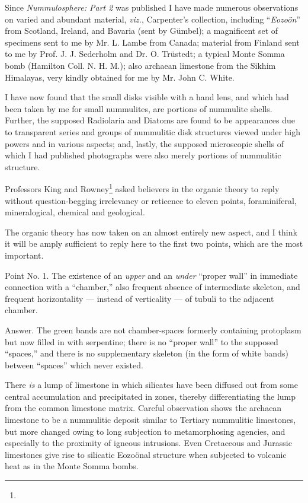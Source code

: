 \documentclass[a4paper, 12pt, oneside]{article}
\begin{document}
Since \emph{Nummulosphere: Part 2} was published I have made numerous observations on varied and abundant material, \emph{viz.}, Carpenter's collection, including ``\emph{Eozoön}'' from Scotland, Ireland, and Bavaria (sent by Gümbel); a magnificent set of specimens sent to me by Mr. L. Lambe from Canada; material from Finland sent to me by Prof. J. J. Sederholm and Dr. O. Trüstedt; a typical Monte Somma bomb (Hamilton Coll. N. H. M.); also archaean limestone from the Sikhim Himalayas, very kindly obtained for me by Mr. John C. White.

I have now found that the small disks visible with a hand lens, and which had been taken by me for small nummulites, are portions of nummulite shells. Further, the supposed Radiolaria and Diatoms are found to be appearances due to transparent series and groups of nummulitic disk structures viewed under high powers and in various aspects; and, lastly, the supposed microscopic shells of which I had published photographs were also merely portions of nummulitic structure.

Professors King and Rowney\footnote{} asked believers in the organic theory to reply without question-begging irrelevancy or reticence to eleven points, foraminiferal, mineralogical, chemical and geological.

The organic theory has now taken on an almost entirely new aspect, and I think it will be amply sufficient to reply here to the first two points, which are the most important.

Point No. 1. The existence of an \emph{upper} and an \emph{under} ``proper wall'' in immediate connection with a ``chamber,'' also frequent absence of intermediate skeleton, and frequent horizontality --- instead of verticality --- of tubuli to the adjacent chamber.

Answer. The green bands are not chamber-spaces formerly containing protoplasm but now filled in with serpentine; there is no ``proper wall'' to the supposed ``spaces,'' and there is no supplementary skeleton (in the form of white bands) between ``spaces'' which never existed.

There \emph{is} a lump of limestone in which silicates have been diffused out from some central accumulation and precipitated in zones, thereby differentiating the lump from the common limestone matrix. Careful observation shows the archaean limestone to be a nummulitic deposit similar to Tertiary nummulitic limestones, but more changed owing to long subjection to metamorphosing agencies, and especially to the proximity of igneous intrusions. Even Cretaceous and Jurassic limestones give rise to silicatic Eozoönal structure when subjected to volcanic heat as in the Monte Somma bombs.
\end{document}

